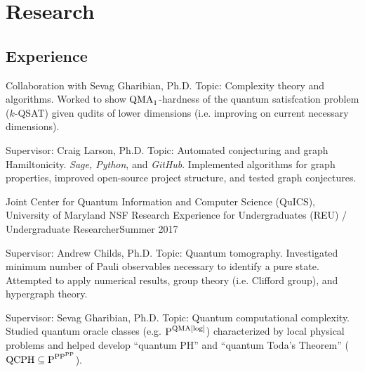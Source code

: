 \documentclass[11pt,letterpaper,serif]{moderncv}
\begin{document}
\section{Research}
\subsection{Experience}
{	
	\begin{adjustwidth}{.25in}{}
		Collaboration with Sevag Gharibian, Ph.D. \newline
		Topic: Complexity theory and algorithms. Worked to show $\textup{QMA}_{1}$-hardness of the quantum satisfcation problem ($k$-QSAT) given qudits of lower dimensions (i.e. improving on current necessary dimensions).
	\end{adjustwidth}
}

{	
	\begin{adjustwidth}{.25in}{}
		Supervisor: Craig Larson, Ph.D. \newline
		Topic: Automated conjecturing and graph Hamiltonicity. \textit{Sage, Python}, and \textit{GitHub}. Implemented algorithms for graph properties, improved open-source project structure, and tested graph conjectures.
	\end{adjustwidth}
}

\cventry{}
{\small Joint Center for Quantum Information and Computer Science (QuICS), University of Maryland}
{NSF Research Experience for Undergraduates (REU) / Undergraduate Researcher}{Summer 2017}{}
{	
	\begin{adjustwidth}{.25in}{}
		Supervisor: Andrew Childs, Ph.D. \newline
		Topic: Quantum tomography. Investigated minimum number of Pauli observables necessary to identify a pure state. Attempted to apply numerical results, group theory (i.e. Clifford group), and hypergraph theory.
	\end{adjustwidth}
}

{
	\begin{adjustwidth}{.25in}{}
		Supervisor: Sevag Gharibian, Ph.D. \newline
		Topic: Quantum computational complexity. Studied quantum oracle classes  (e.g. {\scriptsize $\textup{P}^{\textup{QMA[log]}}$}) characterized by local physical problems and helped develop ``quantum PH'' and ``quantum Toda's Theorem'' ({\scriptsize $\textup{QCPH}\subseteq \textup{P}^{\textup{PP}^{\textup{PP}}}$}).
	\end{adjustwidth}
}
\end{document}
